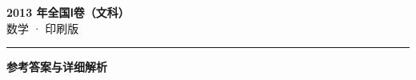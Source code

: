 \documentclass[zihao=5, a4paper]{ctexart}
\begin{document}
\begin{center}
  {\Large\bfseries 2013 年全国Ⅰ卷（文科）}\\[4pt]
  {\large 数学 · 印刷版}
\end{center}
\medskip
{}

\par\bigskip\hrule\bigskip
{}
\begin{center}{\large\bfseries 参考答案与详细解析}\end{center}
\smallskip

\end{document}
